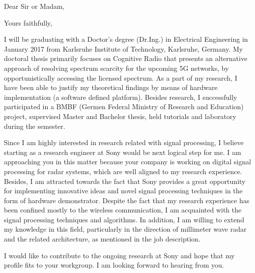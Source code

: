 \documentclass[11pt,a4paper,sans]{moderncv}        %
\begin{document}
\date{03 November 2016}
\opening{Dear Sir or Madam,}
\closing{Yours faithfully,}
\makelettertitle
I will be graduating with a Doctor's degree (Dr.Ing.) in Electrical Engineering in January 2017 from Karlsruhe Institute of Technology, Karlsruhe, Germany. My doctoral thesis primarily focuses on Cognitive Radio that presents an alternative approach of resolving spectrum scarcity for the upcoming 5G networks, by opportunistically accessing the licensed spectrum. As a part of my research, I have been able to justify my theoretical findings by means of hardware implementation (a software defined platform). Besides research, I successfully participated in a BMBF (Germen Federal Ministry of Research and Education) project, supervised Master and Bachelor thesis, held tutorials and laboratory during the semester. 

Since I am highly interested in research related with signal processing, I believe starting as a research engineer at Sony would be next logical step for me. I am approaching you in this matter because your company is working on digital signal processing for radar systems, which are well aligned to my research experience. Besides, I am attracted towards the fact that Sony provides a great opportunity for implementing innovative ideas and novel signal processing techniques in the form of hardware demonstrator. Despite the fact that my research experience has been confined mostly to the wireless communication, I am acquainted with the signal processing techniques and algorithms. In addition, I am willing to extend my knowledge in this field, particularly in the direction of millimeter wave radar and the related architecture, as mentioned in the job description.

I would like to contribute to the ongoing research at Sony and hope that my profile fits to your workgroup. I am looking forward to hearing from you. 


\makeletterclosing
\end{document}
